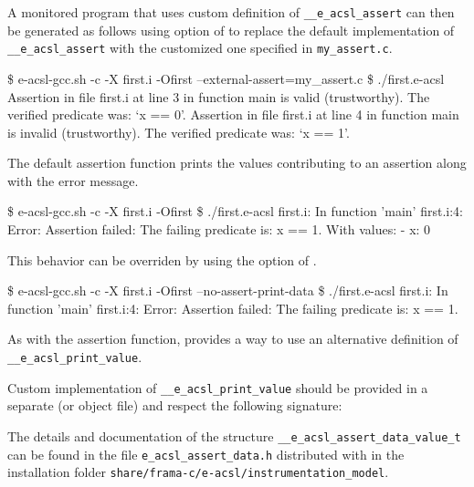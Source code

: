 
A monitored program that uses custom definition of
\texttt{\_\_e\_acsl\_assert} can then be generated
as follows using  option of \eacslgcc to replace the
default implementation of \texttt{\_\_e\_acsl\_assert}
with the customized one specified in \texttt{my\_assert.c}.

\begin{logs}
\$ e-acsl-gcc.sh -c -X first.i -Ofirst --external-assert=my_assert.c
\$ ./first.e-acsl
Assertion in file first.i at line 3 in function main is valid (trustworthy).
The verified predicate was: `x == 0'.
Assertion in file first.i at line 4 in function main is invalid (trustworthy).
The verified predicate was: `x == 1'.
\end{logs}

The default assertion function prints the values contributing to an assertion
along with the error message.

\begin{logs}
\$ e-acsl-gcc.sh -c -X first.i -Ofirst
\$ ./first.e-acsl
first.i: In function 'main'
first.i:4: Error: Assertion failed:
        The failing predicate is:
        x == 1.
        With values:
        - x: 0
\end{logs}

This behavior can be overriden by using the 
option of \eacslgcc.

\begin{logs}
  \$ e-acsl-gcc.sh -c -X first.i -Ofirst --no-assert-print-data
  \$ ./first.e-acsl
  first.i: In function 'main'
  first.i:4: Error: Assertion failed:
          The failing predicate is:
          x == 1.
\end{logs}

As with the assertion function, \eacslgcc provides a way to use an alternative
definition of
\texttt{\_\_e\_acsl\_print\_value}.

Custom implementation of \texttt{\_\_e\_acsl\_print\_value}
 should be provided in a separate \C
(or object file) and respect the following signature:


The details and documentation of the structure
\texttt{\_\_e\_acsl\_assert\_data\_value\_t} can be found in the file
\texttt{e\_acsl\_assert\_data.h} distributed with \eacsl in the installation
folder \texttt{share/frama-c/e-acsl/instrumentation\_model}.

